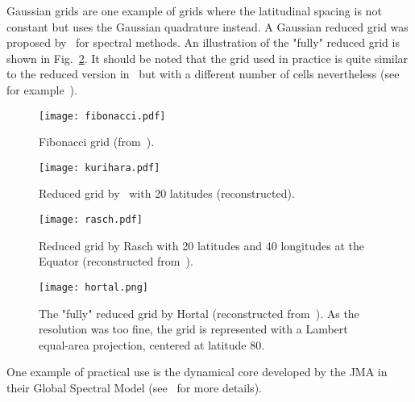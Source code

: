 Gaussian grids are one example of grids where the latitudinal spacing is not
constant but uses the Gaussian quadrature instead. A Gaussian reduced grid was
proposed by~\cite{Hortal1990} for spectral methods. An illustration of the
"fully" reduced grid is shown in Fig.~\ref{fig:hortal}.  It should be noted that
the grid used in practice is quite similar to the reduced version
in~\cite{Hortal1990} but with a different number of cells nevertheless (see for
example~). 
\begin{figure}
  \begin{minipage}[b]{0.48\linewidth}
    \centering
    \texttt{[image: fibonacci.pdf]}
    \caption{Fibonacci grid (from~\cite{Swinbank2006}).}
    \label{fig:fibonacci}
  \end{minipage}
  \hfill
  \begin{minipage}[b]{0.45\linewidth}
    \centering
    \texttt{[image: kurihara.pdf]}
    \caption{Reduced grid by~\cite{Kurihara1965} with 20 latitudes (reconstructed).}
    \label{fig:kurihara}
  \end{minipage}
\end{figure}
\begin{figure}
  \begin{minipage}[t]{0.45\linewidth}
    \centering
    \texttt{[image: rasch.pdf]}
    \caption{Reduced grid by Rasch with 20 latitudes and 40 longitudes at the
      Equator (reconstructed from~\cite{Rasch1994}).}
    \label{fig:rasch}
  \end{minipage}
  \hfill
  \begin{minipage}[t]{0.48\linewidth}
    \centering
    \texttt{[image: hortal.png]}
    \caption{The "fully" reduced grid by Hortal (reconstructed
      from~\cite{Rasch1994}). As the resolution was too fine, the grid is
      represented with a \gls{Lambert equal-area projection}, centered at latitude
  80\degree. }
    \label{fig:hortal}
  \end{minipage}
  \hfill
\end{figure}
One example of practical use is the dynamical core developed by the \gls{JMA} in
their Global Spectral Model (see~\cite{JMA2013} for more details).

